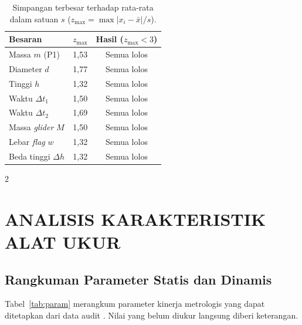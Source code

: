 \documentclass[a4paper, 12pt]{article}
\begin{document}


\begin{table}[H]
\centering
\singlespacing
\caption{Simpangan terbesar terhadap rata-rata dalam satuan $s$ ($z_{\max}=\max|x_i-\bar{x}|/s$).}
\label{tab:z}
\small
\begin{tabular}{l c c}
\toprule
\textbf{Besaran} & $z_{\max}$ & \textbf{Hasil ($z_{\max}<3$)}\\
\midrule
Massa $m$ (P1) & 1,53 & Semua lolos\\
Diameter $d$ & 1,77 & Semua lolos\\
Tinggi $h$ & 1,32 & Semua lolos\\
Waktu $\Delta t_1$ & 1,50 & Semua lolos\\
Waktu $\Delta t_2$ & 1,69 & Semua lolos\\
Massa \textit{glider} $M$ & 1,50 & Semua lolos\\
Lebar \textit{flag} $w$ & 1,32 & Semua lolos\\
Beda tinggi $\Delta h$ & 1,32 & Semua lolos\\
\bottomrule
\end{tabular}
\end{table}

\begin{multicols}{2}
    \raggedcolumns
    \section{ANALISIS KARAKTERISTIK ALAT UKUR}
        \subsection{Rangkuman Parameter Statis dan Dinamis}
        Tabel~\ref{tab:param} merangkum parameter kinerja metrologis yang dapat ditetapkan dari data audit \parencite{JCGM2012VIM,MorrisLangari}. Nilai yang belum diukur langsung diberi keterangan.
\end{multicols}
\end{document}
